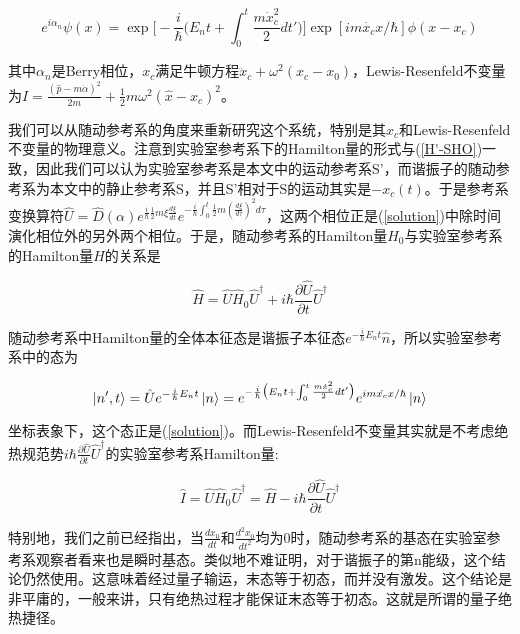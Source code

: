 \documentclass[a4paper]{article}
\begin{document}
        \begin{equation}\label{solution}
            e^{i\alpha_n}\psi(x) = \exp\bigl[-\frac{i}{\hbar}\bigl(E_nt+\int_0^t\frac{m\dot{x}_c^2}{2}dt'\bigr)\bigr] \exp[im\dot{x_c}x/\hbar] \phi(x-x_c)
        \end{equation}

        其中$\alpha_n$是Berry相位，$x_c$满足牛顿方程$\ddot{x}_c+\omega^2(x_c-x_0)$，Lewis-Resenfeld不变量为$I=\frac{(\hat{p}-m\dot{\alpha})^2}{2m}+\frac{1}{2}m\omega^2(\hat{x}-x_c)^2$。
        
        我们可以从随动参考系的角度来重新研究这个系统，特别是其$x_c$和Lewis-Resenfeld不变量的物理意义。注意到实验室参考系下的Hamilton量的形式与(\ref{H'-SHO})一致，因此我们可以认为实验室参考系是本文中的运动参考系S'，而谐振子的随动参考系为本文中的静止参考系S，并且S'相对于S的运动其实是$-x_c(t)$。于是参考系变换算符$\hat{U}=\hat{D}(\alpha)e^{\frac{i}{\hbar}\frac{1}{2}m\xi\frac{d\xi}{dt}}e^{-\frac{i}{\hbar}\int_0^t\frac{1}{2}m(\frac{d \xi}{d\tau})^2 d\tau}$，这两个相位正是(\ref{solution})中除时间演化相位外的另外两个相位。于是，随动参考系的Hamilton量$\hat{H}_0$与实验室参考系的Hamilton量$\hat{H}$的关系是

        \begin{equation}
            \hat{H}=\hat{U}\hat{H}_0\hat{U}^\dagger+i\hbar\frac{\partial\hat{U}}{\partial t}\hat{U}^\dagger
        \end{equation}

        随动参考系中Hamilton量的全体本征态是谐振子本征态$e^{-\frac{i}{\hbar}E_nt}\hat{n}$，所以实验室参考系中的态为

        \begin{equation}
            \ket{n',t}=\hat{U}e^{-\frac{i}{\hbar}E_nt}\ket{n}=e^{-\frac{i}{\hbar}\bigl(E_nt+\int_0^t\frac{m\dot{x}_c^2}{2}dt'\bigr)} e^{im\dot{x_c}x/\hbar} \ket{n}
        \end{equation}

        坐标表象下，这个态正是(\ref{solution})。而Lewis-Resenfeld不变量其实就是不考虑绝热规范势$i\hbar\frac{\partial\hat{U}}{\partial t}\hat{U}^\dagger$的实验室参考系Hamilton量:

        \begin{equation}
            \hat{I}=\hat{U}\hat{H}_0\hat{U}^\dagger=\hat{H}-i\hbar\frac{\partial\hat{U}}{\partial t}\hat{U}^\dagger
        \end{equation}

        特别地，我们之前已经指出，当$\frac{dx_0}{dt}$和$\frac{d^2x_0}{dt^2}$均为0时，随动参考系的基态在实验室参考系观察者看来也是瞬时基态。类似地不难证明，对于谐振子的第n能级，这个结论仍然使用。这意味着经过量子输运，末态等于初态，而并没有激发。这个结论是非平庸的，一般来讲，只有绝热过程才能保证末态等于初态。这就是所谓的量子绝热捷径\cite{bib:fifteen}。
\end{document}
